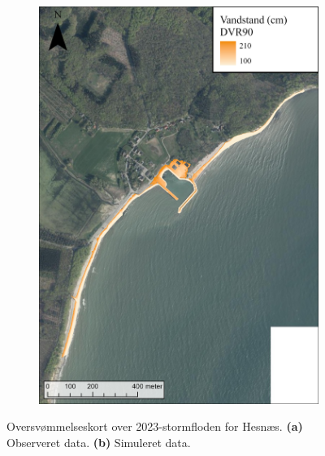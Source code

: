 \begin{figure}[H]
\begin{subfigure}[t]{0.5\textwidth}
        \includegraphics[width=0.95\linewidth]{images/Resultater/2023Model/2023 model_hesnaes.jpg}
        \caption{}
        \label{Subfig: Model Hesnæs}
    \end{subfigure}
    \caption{Oversvømmelseskort over 2023-stormfloden for Hesnæs. \textbf{(a)} Observeret data. \textbf{(b)} Simuleret data.}
    \label{Figur: Målt & simuleret Hesnæs}
\end{figure} 

